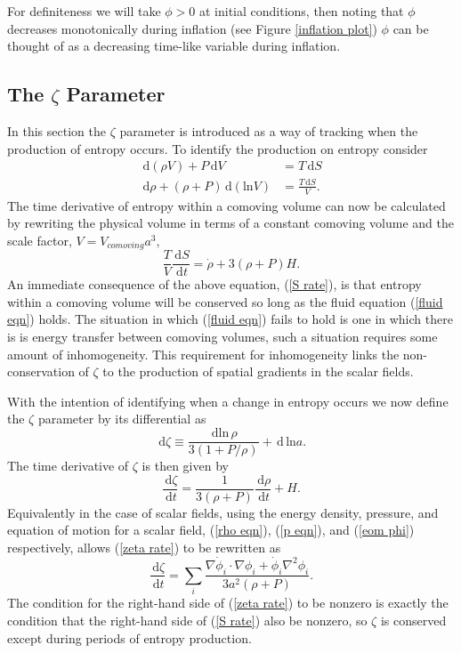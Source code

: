 \documentclass[letterpaper,11pt]{article}
\newcommand{\ud}{\,\mathrm{d}}
\begin{document}
For definiteness we will take $\phi>0$ at initial conditions, then noting that $\phi$ decreases monotonically during inflation (see Figure \ref{inflation plot}) $\phi$ can be thought of as a decreasing time-like variable during inflation. 

\subsection{The $\zeta$ Parameter} \label{zeta theory}
In this section the $\zeta$ parameter is introduced as a way of tracking when the production of entropy occurs. To identify the production on entropy consider 
\begin{align}
\ud (\rho V) + P\ud V &= T \ud S \\
\ud \rho + (\rho + P)\ud(\mathrm{ln}V) &= \frac{T\ud S}{V}.
\end{align}
The time derivative of entropy within a comoving volume can now be calculated by rewriting the physical volume in terms of a constant comoving volume and the scale factor, $V=V_{comoving}a^3$,
\begin{equation}
\frac{T}{V}\frac{\ud S}{\ud t} = \dot{\rho} + 3(\rho + P)H. \label{S rate}
\end{equation}
An immediate consequence of the above equation, (\ref{S rate}), is that entropy within a comoving volume will be conserved so long as the fluid equation (\ref{fluid eqn}) holds. The situation in which (\ref{fluid eqn}) fails to hold is one in which there is is energy transfer between comoving volumes, such a situation requires some amount of inhomogeneity. This requirement for inhomogeneity links the non-conservation of $\zeta$ to the production of spatial gradients in the scalar fields.

With the intention of identifying when a change in entropy occurs we now define the $\zeta$ parameter \cite{pers} by its differential as
\begin{equation}
\ud \zeta \equiv \frac{\ud \mathrm{ln}\,\rho}{3(1+P/\rho)} + \ud\, \mathrm{ln} a.
\end{equation}
The time derivative of $\zeta$ is then given by
\begin{equation}
\frac{\ud \zeta}{\ud t} = \frac{1}{3(\rho + P)}\frac{\ud \rho}{\ud t} + H. \label{zeta rate}
\end{equation}
Equivalently in the case of scalar fields, using the energy density, pressure, and equation of motion for a scalar field, (\ref{rho eqn}), (\ref{p eqn}), and (\ref{eom phi}) respectively, allows (\ref{zeta rate}) to be rewritten as
\begin{equation}
\frac{\ud \zeta}{\ud t} = \sum_i \frac{\nabla \dot{\phi}_i \cdot \nabla \phi_i + \dot{\phi}_i\nabla^2\phi_i}{3a^2(\rho + P)}. \label{zeta source}
\end{equation}
The condition for the right-hand side of (\ref{zeta rate}) to be nonzero is exactly the condition that the right-hand side of (\ref{S rate}) also be nonzero, so $\zeta$ is conserved except during periods of entropy production.
\end{document}

